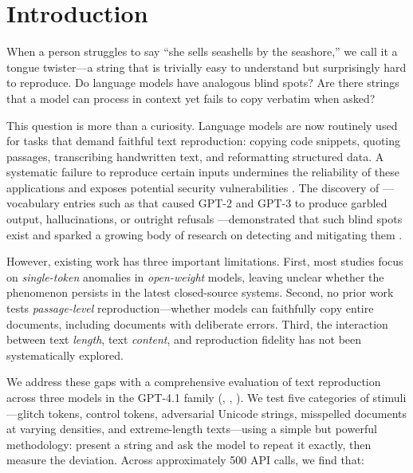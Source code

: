 \section{Introduction}
\label{sec:intro}

When a person struggles to say ``she sells seashells by the seashore,'' we call it a tongue twister---a string that is trivially easy to understand but surprisingly hard to reproduce. Do language models have analogous blind spots? Are there strings that a model can process in context yet fails to copy verbatim when asked?

This question is more than a curiosity. Language models are now routinely used for tasks that demand faithful text reproduction: copying code snippets, quoting passages, transcribing handwritten text, and reformatting structured data. A systematic failure to reproduce certain inputs undermines the reliability of these applications and exposes potential security vulnerabilities \citep{geiping2024coercing}. The discovery of \glitchtokens---vocabulary entries such as \magikarp that caused GPT-2 and GPT-3 to produce garbled output, hallucinations, or outright refusals \citep{rumbelow2023solidgoldmagikarp}---demonstrated that such blind spots exist and sparked a growing body of research on detecting and mitigating them \citep{land2024fishing, li2024glitch, zhang2024glitchprober, wu2024glitchminer}.

However, existing work has three important limitations. First, most studies focus on \emph{single-token} anomalies in \emph{open-weight} models, leaving unclear whether the phenomenon persists in the latest closed-source systems. Second, no prior work tests \emph{passage-level} reproduction---whether models can faithfully copy entire documents, including documents with deliberate errors. Third, the interaction between text \emph{length}, text \emph{content}, and reproduction fidelity has not been systematically explored.

We address these gaps with a comprehensive evaluation of text reproduction across three models in the GPT-4.1 family (\gptfull, \gptmini, \gptomini). We test five categories of stimuli---glitch tokens, control tokens, adversarial Unicode strings, misspelled documents at varying densities, and extreme-length texts---using a simple but powerful methodology: present a string and ask the model to repeat it exactly, then measure the deviation. Across approximately 500 API calls, we find that:

